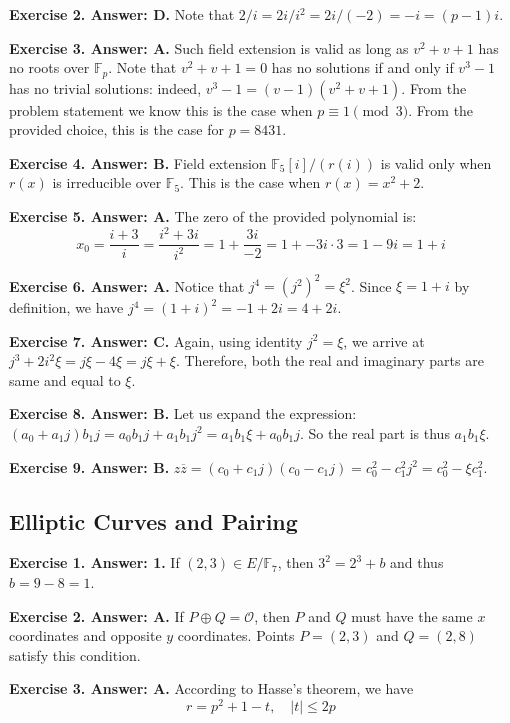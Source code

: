\documentclass[../lecture-notes-148x210.tex]{subfiles}
\begin{document}
\textbf{Exercise 2. Answer: D.} Note that $2/i=2i/i^2=2i/(-2)=-i=(p-1)i$. 

\textbf{Exercise 3. Answer: A.} Such field extension is valid as long as $v^2+v+1$
has no roots over $\mathbb{F}_p$. Note that $v^2+v+1=0$ has no solutions if and
only if $v^3-1$ has no trivial solutions: indeed, $v^3-1=(v-1)(v^2+v+1)$. From
the problem statement we know this is the case when $p \equiv 1 \pmod{3}$. From 
the provided choice, this is the case for $p=8431$.

\textbf{Exercise 4. Answer: B.} Field extension $\mathbb{F}_5[i]/(r(i))$
is valid only when $r(x)$ is irreducible over $\mathbb{F}_5$. This is the 
case when $r(x) = x^2+2$.

\textbf{Exercise 5. Answer: A.} The zero of the provided polynomial is:
\begin{equation*}
    x_0 = \frac{i+3}{i} = \frac{i^2+3i}{i^2} = 1 + \frac{3i}{-2} = 1 + -3i \cdot 3 = 1-9i=1+i
\end{equation*}

\textbf{Exercise 6. Answer: A.} Notice that $j^4=(j^2)^2=\xi^2$. Since $\xi=1+i$
by definition, we have $j^4=(1+i)^2=-1+2i=4+2i$.

\textbf{Exercise 7. Answer: C.} Again, using identity $j^2=\xi$, we arrive at 
$j^3+2i^2\xi = j\xi-4\xi = j\xi+\xi$. Therefore, both the real and imaginary 
parts are same and equal to $\xi$.

\textbf{Exercise 8. Answer: B.} Let us expand the expression: $(a_0+a_1j)b_1j=
a_0b_1j+a_1b_1j^2=a_1b_1\xi+a_0b_1j$. So the real part is thus $a_1b_1\xi$.

\textbf{Exercise 9. Answer: B.} $z\overline{z}=(c_0+c_1j)(c_0-c_1j) = c_0^2-c_1^2j^2=c_0^2-\xi c_1^2$.

\subsection*{Elliptic Curves and Pairing}

\textbf{Exercise 1. Answer: 1.} If $(2,3) \in E/\mathbb{F}_7$, then $3^2=2^3+b$ 
and thus $b=9-8=1$. 

\textbf{Exercise 2. Answer: A.} If $P\oplus Q=\mathcal{O}$, then $P$ and $Q$ must have 
the same $x$ coordinates and opposite $y$ coordinates. Points $P=(2,3)$ and 
$Q=(2,8)$ satisfy this condition.

\textbf{Exercise 3. Answer: A.} According to Hasse's theorem, we have
\begin{equation*}
    r = p^2 + 1 - t, \quad |t| \leq 2p
\end{equation*}
\end{document}
